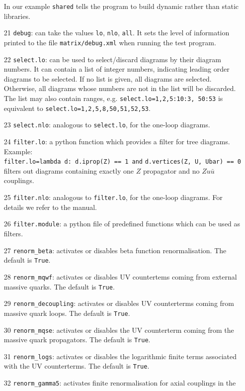 \documentclass[11pt,a4paper]{refrep}
\begin{document}
\begin{enumerate}
In our example {\tt shared} tells the program to 
build dynamic rather than static libraries.
\item[21] \texttt{debug}: can take the values  {\tt lo}, {\tt nlo}, {\tt all}.
It sets the level of information printed to the file {\tt matrix/debug.xml} when running the test program.
\item[22] \texttt{select.lo}: can be used to select/discard diagrams by their diagram numbers.
It can contain a list of integer numbers, indicating leading order diagrams to be
selected. If no list is given, all diagrams are selected.       
Otherwise, all diagrams whose numbers are not in the list will be discarded.          
The list may also contain ranges, e.g.                                    
{\tt select.lo=1,2,5:10:3, 50:53} is equivalent to {\tt select.lo=1,2,5,8,50,51,52,53}.      
\item[23] \texttt{select.nlo}: analogous to \texttt{select.lo},  for the one-loop diagrams.
\item[24] \texttt{filter.lo}:  a python function which provides a filter for tree diagrams.    
Example:  \\  
{\tt filter.lo=lambda d: d.iprop(Z) == 1  and}
{\tt  d.vertices(Z, U, Ubar) == 0 } filters out
diagrams containing exactly one $Z$ propagator and no $Zu\bar{u}$ couplings. 
\item[25] \texttt{filter.nlo}:  analogous to \texttt{filter.lo},  for the one-loop diagrams.
For details we refer to the manual.
\item[26] \texttt{filter.module}: a python file of predefined functions which can be used as filters.   
\item[27] \texttt{renorm\_beta}: activates or disables beta function renormalisation. The default is  {\tt True}. 
\item[28] \texttt{renorm\_mqwf}:  activates or disables UV countertems coming from
external massive quarks. The default is  {\tt True}.
\item[29] \texttt{renorm\_decoupling}:   activates or disables UV counterterms coming from  
massive quark loops. The default is  {\tt True}.
\item[30] \texttt{renorm\_mqse}:  activates or disables the UV counterterm coming from the 
massive quark propagators. The default is  {\tt True}.
\item[31] \texttt{renorm\_logs}: activates or disables the logarithmic finite terms  
associated with the UV counterterms.   The default is  {\tt True}.
\item[32] \texttt{renorm\_gamma5}: activates finite renormalisation for axial couplings in the 

\end{enumerate}
\end{document}
